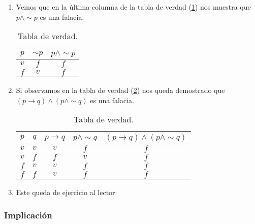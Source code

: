 \solu
\begin{enumerate}
\item Vemos que en la última columna de la tabla de verdad (\ref{fal1})
nos muestra que $p\wedge\sim p$ es una falacia. 
\begin{table}[H]
\centering

\caption{Tabla de verdad.}
\label{fal1}

\begin{tabular}{c|c|c}
\arrayrulecolor{ptctitle}\cellcolor{ptctitle!50}$p$ &
\cellcolor{ptctitle!50}$\sim p$ &
\cellcolor{ptctitle!50}$p\wedge\sim p$\tabularnewline
\hline 
\cellcolor{ptcbackground} $v$ &
\cellcolor{ptcbackground}$f$ &
\cellcolor{ptcbackground}$f$\tabularnewline
\hline 
\cellcolor{gray!50}$f$ &
\cellcolor{gray!50} $v$ &
\cellcolor{gray!50}$f$\tabularnewline
\hline 
\end{tabular}
\end{table}
\item Si observamos en la tabla de verdad (\ref{fal2}) nos queda demostrado
que $(p\rightarrow q)\wedge\left(p\wedge\sim q\right)$ es una falacia.
\begin{table}[H]
\centering

\caption{Tabla de verdad.}
\label{fal2}

\begin{tabular}{c|c|c|c|c}
\arrayrulecolor{ptctitle}\cellcolor{ptctitle!50}$p$ &
\cellcolor{ptctitle!50}$q$ &
\cellcolor{ptctitle!50}$p\rightarrow q$ &
\cellcolor{ptctitle!50}$p\wedge\sim q$ &
\cellcolor{ptctitle!50}$(p\rightarrow q)\wedge\left(p\wedge\sim q\right)$\tabularnewline
\hline 
\cellcolor{ptcbackground} $v$ &
\cellcolor{ptcbackground}$v$ &
\cellcolor{ptcbackground}$v$ &
\cellcolor{ptcbackground}$f$ &
\cellcolor{ptcbackground}$f$\tabularnewline
\hline 
\cellcolor{gray!50}$v$ &
\cellcolor{gray!50} $f$ &
\cellcolor{gray!50}$f$ &
\cellcolor{gray!50}$v$ &
\cellcolor{gray!50}$f$\tabularnewline
\hline 
\cellcolor{ptcbackground}$f$ &
\cellcolor{ptcbackground} $v$ &
\cellcolor{ptcbackground} $v$ &
\cellcolor{ptcbackground}$f$ &
\cellcolor{ptcbackground}$f$\tabularnewline
\hline 
\cellcolor{gray!50} $f$ &
\cellcolor{gray!50} $f$ &
\cellcolor{gray!50} $v$ &
\cellcolor{gray!50}$f$ &
\cellcolor{gray!50}$f$\tabularnewline
\hline 
\end{tabular}
\end{table}
\item Este queda de ejercicio al lector
\end{enumerate}

\subsubsection{Implicación}

